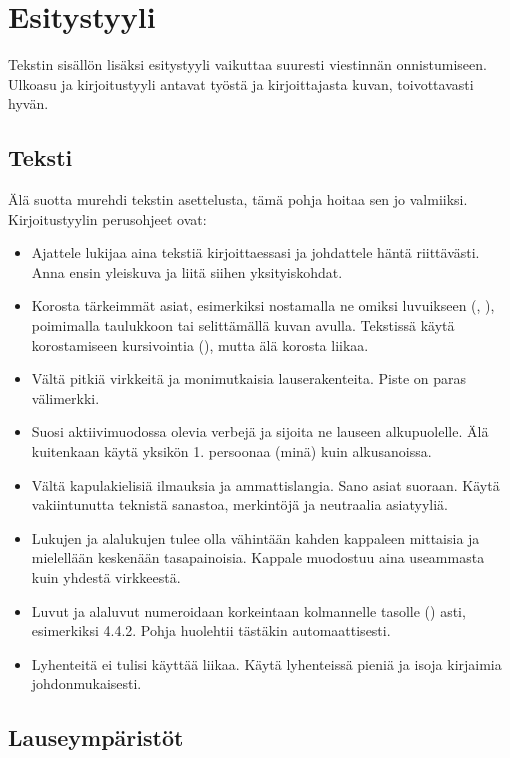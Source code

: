\chapter{Esitystyyli}%
\label{ch:esitystyyli}

Tekstin sisällön lisäksi esitystyyli vaikuttaa suuresti viestinnän onnistumiseen. Ulkoasu ja kirjoitustyyli antavat työstä ja kirjoittajasta kuvan, toivottavasti hyvän.

\section{Teksti}

Älä suotta murehdi tekstin asettelusta, tämä pohja hoitaa sen jo valmiiksi. Kirjoitustyylin perusohjeet ovat:

\begin{itemize}
\item Ajattele lukijaa aina tekstiä kirjoittaessasi ja johdattele häntä riittävästi. Anna ensin yleiskuva ja liitä siihen yksityiskohdat.
\item Korosta tärkeimmät asiat, esimerkiksi nostamalla ne omiksi luvuikseen (, ), poimimalla taulukkoon tai selittämällä kuvan avulla. Tekstissä käytä korostamiseen kursivointia (), mutta älä korosta liikaa.
\item Vältä pitkiä virkkeitä ja monimutkaisia lauserakenteita. Piste on paras välimerkki.
\item Suosi aktiivimuodossa olevia verbejä ja sijoita ne lauseen alkupuolelle. Älä kuitenkaan käytä yksikön 1. persoonaa (minä) kuin alkusanoissa.
\item Vältä kapulakielisiä ilmauksia ja ammattislangia. Sano asiat suoraan. Käytä vakiintunutta teknistä sanastoa, merkintöjä ja neutraalia asiatyyliä.
\item Lukujen ja alalukujen tulee olla vähintään kahden kappaleen mittaisia ja mielellään keskenään tasapainoisia. Kappale muodostuu aina useammasta kuin yhdestä virkkeestä.
\item Luvut ja alaluvut numeroidaan korkeintaan kolmannelle tasolle () asti, esimerkiksi 4.4.2. Pohja huolehtii tästäkin automaattisesti.
\item Lyhenteitä ei tulisi käyttää liikaa. Käytä lyhenteissä pieniä ja isoja kirjaimia johdonmukaisesti.
\end{itemize}

\section{Lauseympäristöt}

